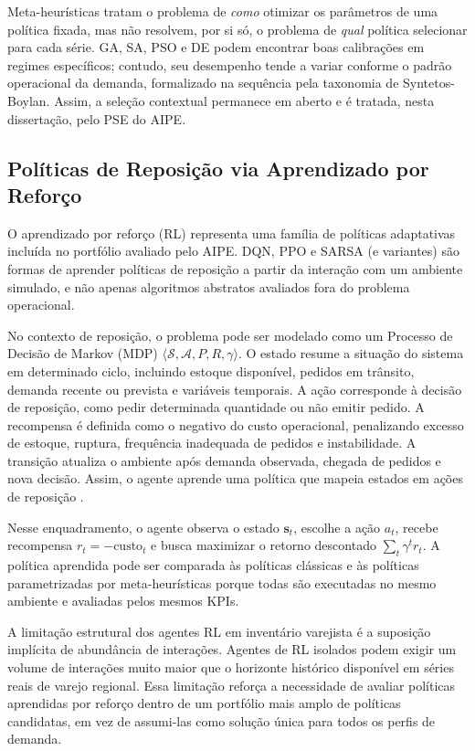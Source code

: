 \smallskip
Meta-heurísticas tratam o problema de \textit{como} otimizar os parâmetros de uma política fixada, mas não resolvem, por si só, o problema de \textit{qual} política selecionar para cada série. GA, SA, PSO e DE podem encontrar boas calibrações em regimes específicos; contudo, seu desempenho tende a variar conforme o padrão operacional da demanda, formalizado na sequência pela taxonomia de Syntetos-Boylan. Assim, a seleção contextual permanece em aberto e é tratada, nesta dissertação, pelo PSE do AIPE.

\subsection{Políticas de Reposição via Aprendizado por Reforço}

O aprendizado por reforço (RL) representa uma família de políticas adaptativas incluída no portfólio avaliado pelo AIPE. DQN, PPO e SARSA (e variantes) são formas de aprender políticas de reposição a partir da interação com um ambiente simulado, e não apenas algoritmos abstratos avaliados fora do problema operacional.

No contexto de reposição, o problema pode ser modelado como um Processo de Decisão de Markov (MDP) $\langle \mathcal{S}, \mathcal{A}, P, R, \gamma \rangle$. O estado resume a situação do sistema em determinado ciclo, incluindo estoque disponível, pedidos em trânsito, demanda recente ou prevista e variáveis temporais. A ação corresponde à decisão de reposição, como pedir determinada quantidade ou não emitir pedido. A recompensa é definida como o negativo do custo operacional, penalizando excesso de estoque, ruptura, frequência inadequada de pedidos e instabilidade. A transição atualiza o ambiente após demanda observada, chegada de pedidos e nova decisão. Assim, o agente aprende uma política que mapeia estados em ações de reposição \citep{SuttonBarto2018RL}.

Nesse enquadramento, o agente observa o estado $\mathbf{s}_t$, escolhe a ação $a_t$, recebe recompensa $r_t = -\text{custo}_t$ e busca maximizar o retorno descontado $\sum_{t}\gamma^t r_t$. A política aprendida pode ser comparada às políticas clássicas e às políticas parametrizadas por meta-heurísticas porque todas são executadas no mesmo ambiente e avaliadas pelos mesmos KPIs.

A limitação estrutural dos agentes RL em inventário varejista é a suposição implícita de abundância de interações. Agentes de RL isolados podem exigir um volume de interações muito maior que o horizonte histórico disponível em séries reais de varejo regional. Essa limitação reforça a necessidade de avaliar políticas aprendidas por reforço dentro de um portfólio mais amplo de políticas candidatas, em vez de assumi-las como solução única para todos os perfis de demanda.

